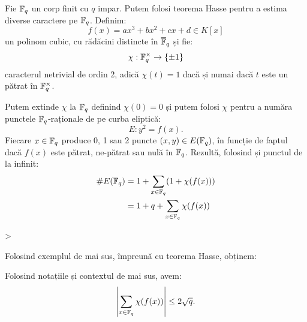 \begin{example}\label{exm:eliptic-fq}
    Fie $ \mathbb{F}_q $ un corp finit cu $ q $ impar. Putem folosi teorema Hasse pentru a estima
    diverse caractere pe $ \mathbb{F}_q $. Definim:
    \[
        f(x) = ax^3 + bx^2 + cx + d \in K[x]
    \]
    un polinom cubic, cu rădăcini distincte în $ \overline{\mathbb{F}}_q $ și fie:
    \[
        \chi : \mathbb{F}_q^\times \to \{ \pm 1 \}
    \]
    caracterul netrivial de ordin 2, adică $ \chi(t) = 1 $ dacă și numai dacă
    $ t $ este un pătrat în $ \mathbb{F}_q^\times $.

    Putem extinde $ \chi $ la $ \mathbb{F}_q $ definind $ \chi(0) = 0 $ și putem folosi
    $ \chi $ pentru a număra punctele $ \mathbb{F}_q $-raționale de pe curba eliptică:
    \[
        E : y^2 = f(x).
    \]
    Fiecare $ x \in \mathbb{F}_q $ produce 0, 1 sau 2 puncte $ (x, y) \in E(\mathbb{F}_q) $, în
    funcție de faptul dacă $ f(x) $ este pătrat, ne-pătrat sau nulă în $ \mathbb{F}_q $.
    Rezultă, folosind și punctul de la infinit:
    \begin{align*}
        \# E(\mathbb{F}_q) &= 1 + \sum_{x \in \mathbb{F}_q} (1 + \chi(f(x))) \\
                    &= 1 + q + \sum_{x \in \mathbb{F}_q} \chi(f(x))
    \end{align*}
\end{example}>

Folosind exemplul de mai sus, împreună cu teorema Hasse, obținem:
\begin{corollary}\label{cor:hass-char}
    Folosind notațiile și contextul de mai sus, avem:
    \[
        \left| \sum_{x \in \mathbb{F}_q} \chi(f(x)) \right| \leq 2 \sqrt{q}.
    \]
\end{corollary}

